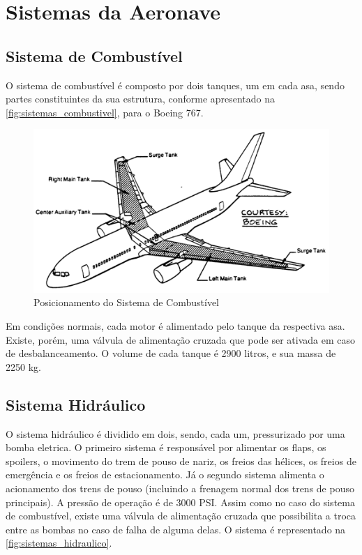 \chapter{Sistemas da Aeronave}


\section{Sistema de Combustível}

O sistema de combustível é composto por dois tanques, um em cada asa, sendo partes constituintes da sua estrutura, conforme apresentado na \autoref{fig:sistemas_combustivel}, para o Boeing 767.

\begin{figure}
\centering
\includegraphics[width=\textwidth]{images/parte3/sistemas_combustivel.png}
\caption{Posicionamento do Sistema de Combustível}
\label{fig:sistemas_combustivel}
\end{figure}

Em condições normais, cada motor é alimentado pelo tanque da respectiva asa.
Existe, porém, uma válvula de alimentação cruzada que pode ser ativada em caso de desbalanceamento.
O volume de cada tanque é 2900 litros, e sua massa de 2250 kg.


\section{Sistema Hidráulico}

O sistema hidráulico é dividido em dois, sendo, cada um, pressurizado por uma bomba eletrica.
O primeiro sistema é responsável por alimentar os flaps, os spoilers, o movimento do trem de pouso de nariz, os freios das hélices, os freios de emergência e os freios de estacionamento.
Já o segundo sistema alimenta o acionamento dos trens de pouso (incluindo a frenagem normal dos trens de pouso principais).
A pressão de operação é de 3000 PSI.
Assim como no caso do sistema de combustível, existe uma válvula de alimentação cruzada que possibilita a troca entre as bombas no caso de falha de alguma delas.
O sistema é representado na \autoref{fig:sistemas_hidraulico}.

